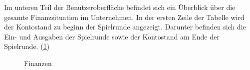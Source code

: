 Im unteren Teil der Benutzeroberfläche befindet sich ein Überblick über die gesamte Finanzsituation im Unternehmen. In der ersten Zeile der Tabelle wird der Kontostand zu beginn der Spielrunde angezeigt. Darunter befinden sich die Ein- und Ausgaben der Spielrunde sowie der Kontostand am Ende der Spielrunde. (\ref{img:ui-bank})

\begin{figure}[htbp]
  \centering
  \caption{Finanzen}
  \label{img:ui-bank}
\end{figure}


\autorende{}